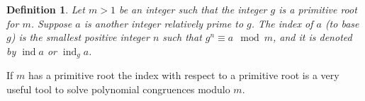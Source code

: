 \documentclass[12pt]{article}
\newtheorem*{defn}{Definition}
\theoremstyle{definition}
\begin{document}
\begin{defn}
Let $m>1$ be an integer such that the integer $g$ is a primitive root for $m$. Suppose $a$ is another integer relatively prime to $g$. The index of $a$ (to base $g$) is the smallest positive integer $n$ such that $g^n\equiv a \mod m$, and it is denoted by $\operatorname{ind} a$ or $\operatorname{ind}_g a$.
\end{defn}

If $m$ has a primitive root the index with respect to a primitive root is a very useful tool to solve polynomial congruences modulo $m$.
\end{document}
